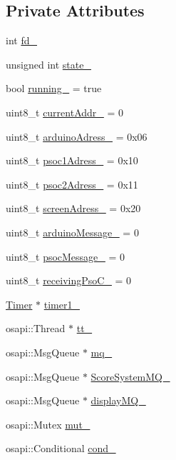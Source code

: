 \subsection*{Private Attributes}
\begin{DoxyCompactItemize}
\item 
int \hyperlink{class_i2_c__reg_aa5fd39295618d3ae819136c60a9a93f9}{fd\+\_\+}
\item 
unsigned int \hyperlink{class_i2_c__reg_a14b21c49054b5101a5b7258abbfcf7ec}{state\+\_\+}
\item 
bool \hyperlink{class_i2_c__reg_ac1783200bd4cfa343c9efcf3d05147d2}{running\+\_\+} = true
\item 
uint8\+\_\+t \hyperlink{class_i2_c__reg_a9f00fe7636749157c56ac0468a1443e9}{current\+Addr\+\_\+} = 0
\item 
uint8\+\_\+t \hyperlink{class_i2_c__reg_a6bfe663e5f48ac17a3fd49226643754e}{arduino\+Adress\+\_\+} = 0x06
\item 
uint8\+\_\+t \hyperlink{class_i2_c__reg_a5812753df4f7f637195db36382817db0}{psoc1\+Adress\+\_\+} = 0x10
\item 
uint8\+\_\+t \hyperlink{class_i2_c__reg_ac6899d5ab5021a60c5250d8b94341a8f}{psoc2\+Adress\+\_\+} = 0x11
\item 
uint8\+\_\+t \hyperlink{class_i2_c__reg_a7fcccc0e344c7b69c1e5d8ba1c90a68b}{screen\+Adress\+\_\+} = 0x20
\item 
uint8\+\_\+t \hyperlink{class_i2_c__reg_a09768cee402326bef0399729305edcf8}{arduino\+Message\+\_\+} = 0
\item 
uint8\+\_\+t \hyperlink{class_i2_c__reg_a7233ee02b2a6f76eff04f9bd7648c958}{psoc\+Message\+\_\+} = 0
\item 
uint8\+\_\+t \hyperlink{class_i2_c__reg_aca7b0128eae9ad08da09376b6b15dc4f}{receiving\+Pso\+C\+\_\+} = 0
\item 
\hyperlink{class_timer}{Timer} $\ast$ \hyperlink{class_i2_c__reg_aaad6b1b2efeb974521239765556a18c8}{timer1\+\_\+}
\item 
osapi\+::\+Thread $\ast$ \hyperlink{class_i2_c__reg_afaa9f5a61f18026faeb1cf499422ee04}{tt\+\_\+}
\item 
osapi\+::\+Msg\+Queue $\ast$ \hyperlink{class_i2_c__reg_a9e139070cc9a328c976e02d50bfc8463}{mq\+\_\+}
\item 
osapi\+::\+Msg\+Queue $\ast$ \hyperlink{class_i2_c__reg_a501dcb1b2bced713fcbac3e52a23b8f3}{Score\+System\+M\+Q\+\_\+}
\item 
osapi\+::\+Msg\+Queue $\ast$ \hyperlink{class_i2_c__reg_a3905d1dee48edcb683df50575ec27113}{display\+M\+Q\+\_\+}
\item 
osapi\+::\+Mutex \hyperlink{class_i2_c__reg_a3c3e7e3c3ff7d9cb70715a960fc909c2}{mut\+\_\+}
\item 
osapi\+::\+Conditional \hyperlink{class_i2_c__reg_a586e78ca7a45a3ffdb33051861a33b5d}{cond\+\_\+}
\end{DoxyCompactItemize}


